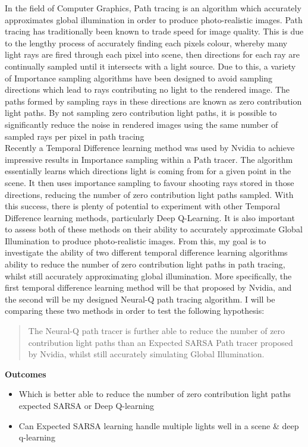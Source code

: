 \documentclass[ %
                    author={Callum Pearce},
                supervisor={Dr. Neill Campbell},
                    degree={MEng},
                     title={How effective are Temporal difference learning methods for reducing the number of zero contribution light paths, while still accurately approximating Global Illumination in Path tracing?},
                  subtitle={},
                      type={research},
                      year={2019} ]{dissertation}
\begin{document}
In the field of Computer Graphics, Path tracing is an algorithm which 
accurately approximates global illumination in order to produce 
photo-realistic images. Path tracing has traditionally been known to 
trade speed for image quality. This is due to the lengthy process of accurately 
finding each pixels colour, whereby many light rays are 
fired through each pixel into scene, then directions for each ray are 
continually sampled until it intersects with a light source. Due to 
this, a variety of Importance sampling algorithms have been designed 
to avoid sampling directions which lead to rays contributing no light 
to the rendered image. The paths formed by sampling rays in these 
directions are known as zero contribution light paths. By not sampling 
zero contribution light paths, it is possible to significantly reduce 
the noise in rendered images using the same number of sampled rays per 
pixel in path tracing\\

Recently a Temporal Difference learning method was used by Nvidia to
achieve impressive results in Importance sampling within a Path tracer.
The algorithm essentially learns which directions light is coming from for
a given point in the scene. It then uses importance sampling to favour shooting
rays stored in those directions, reducing the number of zero contribution light paths
sampled. With this success, there is plenty of potential to experiment with
other Temporal Difference learning methods, particularly Deep Q-Learning.
It is also important to assess both of these methods on their ability to 
accurately approximate Global Illumination to produce photo-realistic images.
From this, my goal is to investigate the ability of two different temporal
difference learning algorithms ability to reduce the number of zero contribution
light paths in path tracing, whilst still accurately approximating global illumination.
More specifically, the first temporal difference learning method will be that proposed
by Nvidia, and the second will be my designed Neural-Q path tracing algorithm.
I will be comparing these two methods in order to test the following hypothesis:

\begin{quote}
The Neural-Q  path tracer is further able to reduce
the number of zero contribution light paths than an Expected SARSA
Path tracer proposed by Nvidia, whilst still accurately simulating Global Illumination.
\end{quote}

\noindent
\textbf{Outcomes}
\begin{itemize}
\item Which is better able to reduce the number of zero contribution light paths expected SARSA or Deep Q-learning
\item Can Expected SARSA learning handle multiple lights well in a scene \& deep q-learning
\end{itemize}
\end{document}
